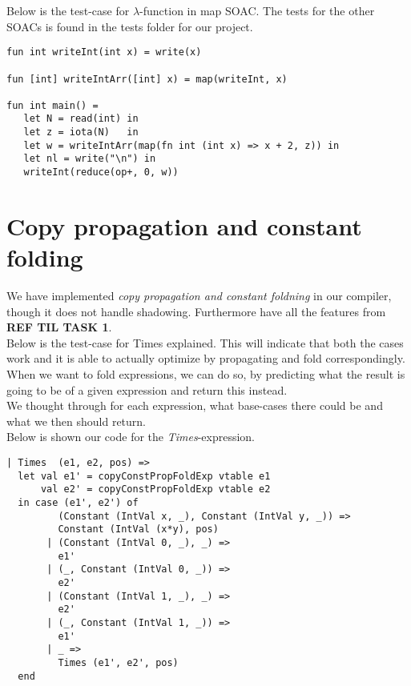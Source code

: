 \documentclass[paper=a4, fontsize=11pt]{scrartcl} %
\numberwithin{equation}{section} %
\numberwithin{figure}{section} %
\numberwithin{table}{section} %
\begin{document}
Below is the test-case for $\lambda$-function in map SOAC. The tests for the other SOACs is found in the tests folder for our project.
\begin{lstlisting}
fun int writeInt(int x) = write(x)

fun [int] writeIntArr([int] x) = map(writeInt, x)

fun int main() =
   let N = read(int) in
   let z = iota(N)   in
   let w = writeIntArr(map(fn int (int x) => x + 2, z)) in
   let nl = write("\n") in
   writeInt(reduce(op+, 0, w))
\end{lstlisting}

\section{Copy propagation and constant folding}

	We have implemented \textit{copy propagation and constant foldning} in our compiler, though it does not handle shadowing. Furthermore have all the features from \textbf{REF TIL TASK 1}.\\
Below is the test-case for Times  explained. This will indicate that both the cases work and it is able to actually optimize by propagating and fold correspondingly.\\

When we want to fold expressions, we can do so, by predicting what the result is going to be of a given expression and return this instead.\\
We thought through for each expression, what base-cases there could be and what we then should return.\\

Below is shown our code for the \textit{Times}-expression. 
\begin{lstlisting}
| Times  (e1, e2, pos) =>
  let val e1' = copyConstPropFoldExp vtable e1
      val e2' = copyConstPropFoldExp vtable e2
  in case (e1', e2') of
         (Constant (IntVal x, _), Constant (IntVal y, _)) =>
         Constant (IntVal (x*y), pos)
       | (Constant (IntVal 0, _), _) =>
         e1'
       | (_, Constant (IntVal 0, _)) =>
         e2'
       | (Constant (IntVal 1, _), _) =>
         e2'
       | (_, Constant (IntVal 1, _)) =>
         e1'
       | _ =>
         Times (e1', e2', pos)
  end
\end{lstlisting}
\end{document}
